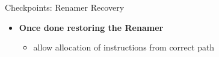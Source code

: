 \documentclass[aspectratio=169,12pt]{beamer}
\begin{document}
\begin{frame}{Checkpoints: Renamer Recovery}
    \centering
    
    \vspace{0.5cm}
    \begin{itemize}
        \item \textbf{Once done restoring the Renamer}
        \begin{itemize}
            \item allow allocation of instructions from correct path
        \end{itemize}
    \end{itemize}
\end{frame}
\end{document}
